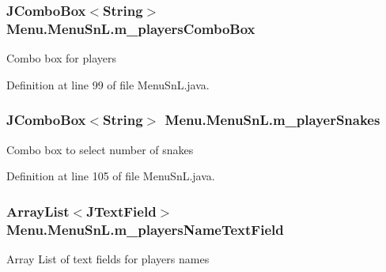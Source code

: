 \hypertarget{class_menu_1_1_menu_sn_l_a52b5fdac24b1860a453eee6f505208da}{}
\subsubsection[{m\+\_\+players\+Combo\+Box}]{\setlength{\rightskip}{0pt plus 5cm}J\+Combo\+Box$<$String$>$ Menu.\+Menu\+Sn\+L.\+m\+\_\+players\+Combo\+Box\hspace{0.3cm}{\ttfamily [private]}}\label{class_menu_1_1_menu_sn_l_a52b5fdac24b1860a453eee6f505208da}
Combo box for players 

Definition at line 99 of file Menu\+Sn\+L.\+java.

\hypertarget{class_menu_1_1_menu_sn_l_acc735c8e538c308d888618f726ddd344}{}
\subsubsection[{m\+\_\+player\+Snakes}]{\setlength{\rightskip}{0pt plus 5cm}J\+Combo\+Box$<$String$>$ Menu.\+Menu\+Sn\+L.\+m\+\_\+player\+Snakes\hspace{0.3cm}{\ttfamily [private]}}\label{class_menu_1_1_menu_sn_l_acc735c8e538c308d888618f726ddd344}
Combo box to select number of snakes 

Definition at line 105 of file Menu\+Sn\+L.\+java.

\hypertarget{class_menu_1_1_menu_sn_l_a8e5b5896ffe07afef10443fe99b45dab}{}
\subsubsection[{m\+\_\+players\+Name\+Text\+Field}]{\setlength{\rightskip}{0pt plus 5cm}Array\+List$<$J\+Text\+Field$>$ Menu.\+Menu\+Sn\+L.\+m\+\_\+players\+Name\+Text\+Field\hspace{0.3cm}{\ttfamily [private]}}\label{class_menu_1_1_menu_sn_l_a8e5b5896ffe07afef10443fe99b45dab}
Array List of text fields for player\textquotesingle{}s names 

